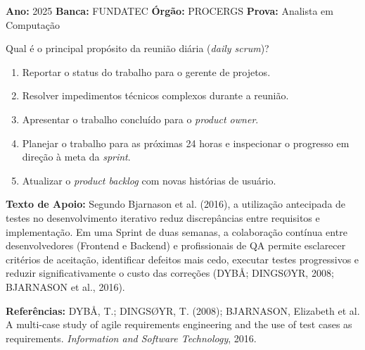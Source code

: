 \documentclass[12pt]{article}
\begin{document}
\vspace{0.15cm}

\begin{metaConcurso}
\small \textbf{Ano:} 2025 \qquad \textbf{Banca:} FUNDATEC \qquad \textbf{Órgão:} PROCERGS \qquad \textbf{Prova:} Analista em Computação
\end{metaConcurso}

\vspace{0.15cm}
\noindent Qual é o principal propósito da reunião diária (\textit{daily scrum})?

\begin{enumerate}[label=\Alph*)]
    \item Reportar o status do trabalho para o gerente de projetos.
    \item Resolver impedimentos técnicos complexos durante a reunião.
    \item Apresentar o trabalho concluído para o \textit{product owner}.
    \item Planejar o trabalho para as próximas 24 horas e inspecionar o progresso em direção à meta da \textit{sprint}.
    \item Atualizar o \textit{product backlog} com novas histórias de usuário.
\end{enumerate}

\vspace{0.6cm}

\vspace{0.15cm}

\begin{textoApoio}
\small
\textbf{Texto de Apoio:} Segundo Bjarnason et al. (2016), a utilização antecipada de testes no desenvolvimento iterativo reduz discrepâncias entre requisitos e implementação. Em uma Sprint de duas semanas, a colaboração contínua entre desenvolvedores (Frontend e Backend) e profissionais de QA permite esclarecer critérios de aceitação, identificar defeitos mais cedo, executar testes progressivos e reduzir significativamente o custo das correções (DYBÅ; DINGSØYR, 2008; BJARNASON et al., 2016).

\vspace{0.15cm}
\noindent\textbf{Referências:} DYBÅ, T.; DINGSØYR, T. (2008); BJARNASON, Elizabeth et al. A multi-case study of agile requirements engineering and the use of test cases as requirements. \textit{Information and Software Technology}, 2016.
\end{textoApoio}
\end{document}
